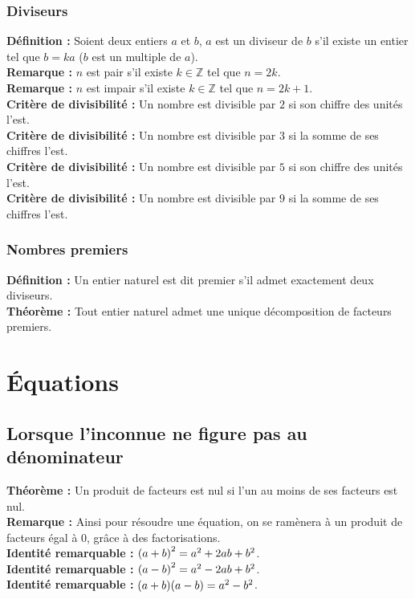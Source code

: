 \documentclass[a4paper,titlepage]{article}
\let\oldsection\section
\renewcommand\section{\clearpage\oldsection}
\let\oldleft\left
\renewcommand{\left}{\mathopen{}\mathclose\bgroup\oldleft}
\let\oldright\right
\renewcommand{\right}{\aftergroup\egroup\oldright}
\begin{document}
        \subsubsection{Diviseurs}
            \textbf{Définition :} Soient deux entiers $a$ et $b$, $a$ est un diviseur de $b$ s’il existe un entier tel que $b=ka$ ($b$ est un multiple de $a$).
            \\
            \textbf{Remarque :} $n$ est pair s’il existe $k\in\mathbb{Z}$ tel que $n=2k$.
            \\
            \textbf{Remarque :} $n$ est impair s’il existe $k\in\mathbb{Z}$ tel que $n=2k+1$.
            \\
            \textbf{Critère de divisibilité :} Un nombre est divisible par $2$ si son chiffre des unités l’est.
            \\
            \textbf{Critère de divisibilité :} Un nombre est divisible par $3$ si la somme de ses chiffres l’est.
            \\
            \textbf{Critère de divisibilité :} Un nombre est divisible par $5$ si son chiffre des unités l’est.
            \\
            \textbf{Critère de divisibilité :} Un nombre est divisible par $9$ si la somme de ses chiffres l’est.
        \subsubsection{Nombres premiers}
            \textbf{Définition :} Un entier naturel est dit premier s’il admet exactement deux diviseurs.
            \\
            \textbf{Théorème :} Tout entier naturel admet une unique décomposition de facteurs premiers.
\section{Équations}
    \subsection{Lorsque l’inconnue ne figure pas au dénominateur}
        \textbf{Théorème :} Un produit de facteurs est nul si l’un au moins de ses facteurs est nul.
        \\
        \textbf{Remarque :} Ainsi pour résoudre une équation, on se ramènera à un produit de facteurs égal à 0, grâce à des factorisations.
        \\
        \textbf{Identité remarquable :} $\left(a+b\right)^{2}=a^{2}+{2}ab+b^{2}$.
        \\
        \textbf{Identité remarquable :} $\left(a-b\right)^{2}=a^{2}-{2}ab+b^{2}$.
        \\
        \textbf{Identité remarquable :} $\left(a+b\right)\left(a-b\right)=a^{2}-b^{2}$.
\end{document}
